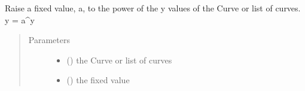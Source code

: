 \documentclass[letterpaper,10pt,english]{sphinxmanual}
\begin{document}
\begin{fulllineitems}
\label{\detokenize{pydv:pydvpy.powa}}
Raise a fixed value, a, to the power of the y values of the Curve or list of curves. y = a\textasciicircum{}y

\begin{sphinxVerbatim}[commandchars=\\\{\}]
  
\end{sphinxVerbatim}

\begin{sphinxVerbatim}[commandchars=\\\{\}]
  
\end{sphinxVerbatim}

\begin{sphinxVerbatim}[commandchars=\\\{\}]
\PYG{p}{[}\PYG{p}{]} 
\end{sphinxVerbatim}
\begin{quote}\begin{description}
\item[{Parameters}] \leavevmode\begin{itemize}
\item {} 
 ({\hyperref[\detokenize{pydv:curve.Curve}]{}}) \textendash{} the Curve or list of curves

\item {} 
 () \textendash{} the fixed value

\end{itemize}

\end{description}\end{quote}

\end{fulllineitems}
\end{document}
